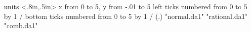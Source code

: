 %
%
\beginpicture
  \setcoordinatesystem units <.8in,.5in>
  \setplotarea x from 0 to 5, y from -.01 to 5 
  \axis left  
    ticks numbered from 0 to 5 by 1 /
  \axis bottom  
    ticks numbered from 0 to 5 by 1 /
 \setquadratic
  \setdots <20pt>
  \setplotsymbol ({\rm .})
 \plot "normal.da1" 
 \plot "rational.da1" 
 \plot "comb.da1" 
\endpicture

